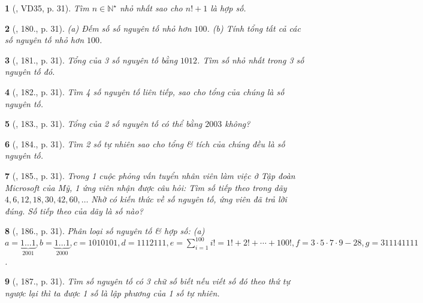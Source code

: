 \documentclass{article}
\newtheorem{baitoan}{}
\begin{document}
\begin{baitoan}[\cite{Binh_Toan_6_tap_1}, VD35, p. 31]
	Tìm $n\in\mathbb{N}^\star$ nhỏ nhất sao cho $n! + 1$ là hợp số.
\end{baitoan}

\begin{baitoan}[\cite{Binh_Toan_6_tap_1}, 180., p. 31]
	(a) Đếm số số nguyên tố nhỏ hơn $100$. (b) Tính tổng tất cả các số nguyên tố nhỏ hơn $100$.
\end{baitoan}

\begin{baitoan}[\cite{Binh_Toan_6_tap_1}, 181., p. 31]
	Tổng của 3 số nguyên tố bằng $1012$. Tìm số nhỏ nhất trong 3 số nguyên tố đó.
\end{baitoan}

\begin{baitoan}[\cite{Binh_Toan_6_tap_1}, 182., p. 31]
	Tìm 4 số nguyên tố liên tiếp, sao cho tổng của chúng là số nguyên tố.
\end{baitoan}

\begin{baitoan}[\cite{Binh_Toan_6_tap_1}, 183., p. 31]
	Tổng của 2 số nguyên tố có thể bằng $2003$ không?
\end{baitoan}

\begin{baitoan}[\cite{Binh_Toan_6_tap_1}, 184., p. 31]
	Tìm 2 số tự nhiên sao cho tổng \& tích của chúng đều là số nguyên tố.
\end{baitoan}

\begin{baitoan}[\cite{Binh_Toan_6_tap_1}, 185., p. 31]
	Trong 1 cuộc phỏng vấn tuyển nhân viên làm việc ở Tập đoàn Microsoft của Mỹ, 1 ứng viên nhận được câu hỏi: Tìm số tiếp theo trong dãy $4,6,12,18,30,42,60,\ldots$ Nhờ có kiến thức về số nguyên tố, ứng viên đã trả lời đúng. Số tiếp theo của dãy là số nào?
\end{baitoan}

\begin{baitoan}[\cite{Binh_Toan_6_tap_1}, 186., p. 31]
	Phân loại số nguyên tố \& hợp số: (a) $a = \underbrace{1\ldots1}_{2001}, b = \underbrace{1\ldots1}_{2000}, c = 1010101, d = 1112111, e = \sum_{i=1}^{100} i! = 1! + 2! + \cdots + 100!, f = 3\cdot5\cdot7\cdot9 - 28, g = 311141111$.
\end{baitoan}

\begin{baitoan}[\cite{Binh_Toan_6_tap_1}, 187., p. 31]
	Tìm số nguyên tố có 3 chữ số biết nếu viết số đó theo thứ tự ngược lại thì ta được 1 số là lập phương của 1 số tự nhiên.
\end{baitoan}
\end{document}
